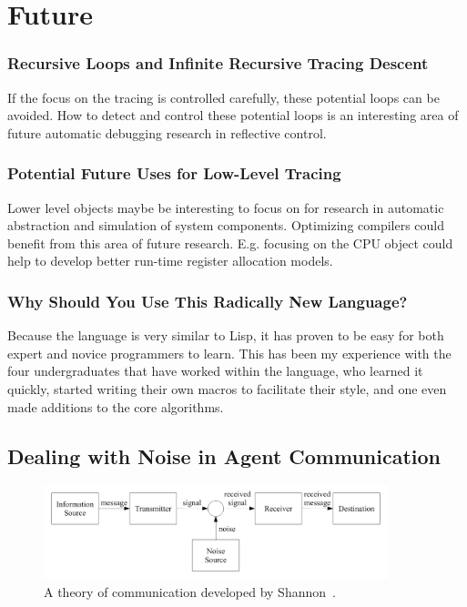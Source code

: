 \chapter{Future}\label{ch:future}

\subsection{Recursive Loops and Infinite Recursive Tracing Descent}

If the focus on the tracing is controlled carefully, these potential
loops can be avoided.  How to detect and control these potential loops
is an interesting area of future automatic debugging research in
reflective control.

\subsection{Potential Future Uses for Low-Level Tracing}

Lower level objects maybe be interesting to focus on for research in
automatic abstraction and simulation of system components.  Optimizing
compilers could benefit from this area of future research.  E.g.
focusing on the CPU object could help to develop better run-time
register allocation models.

\subsection{Why Should You Use This Radically New Language?}

Because the language is very similar to Lisp, it has proven to be easy
for both expert and novice programmers to learn.  This has been my
experience with the four undergraduates that have worked within the
language, who learned it quickly, started writing their own macros to
facilitate their style, and one even made additions to the core
algorithms.

\section{Dealing with Noise in Agent Communication}

\begin{figure}[bth]
  \center
  \includegraphics[width=10cm]{gfx/communication_theory}
  \caption[A theory of communication]{A theory of communication developed by Shannon~\citep{shannon:1959}.}
  \label{fig:communication_theory}
\end{figure}

